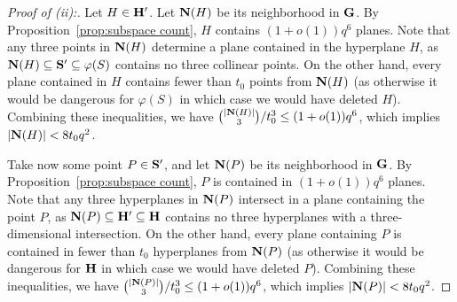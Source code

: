 \documentclass[10pt,a4paper]{amsart}
\begin{document}
    \begin{proof}[Proof of (ii):]Let $H\in \bold{H}'$. Let $\bold{N}(H)$ be its neighborhood in $\bold{G}$. By Proposition~\ref{prop:subspace count}, $H$ contains $(1+o(1))q^6$ planes. Note that any three points in $\bold{N}(H)$ determine a plane contained in the hyperplane $H$, as $\bold{N}(H) \subseteq \bold{S}'\subseteq \varphi(S)$ contains no three collinear points. On the other hand, every plane contained in $H$ contains fewer than $t_0$ points from $\bold{N}(H)$ (as otherwise it would be dangerous for $\varphi(S)$ in which case we would have deleted $H$). Combining these inequalities, we have ${|\bold{N}(H)| \choose 3}/t_0^3\leq (1+o(1))q^6$, which implies  $|\bold{N}(H)|<8t_0q^2$.
    


Take now some point $P \in \bold{S}'$, and let $\bold{N}(P)$ be its neighborhood in $\bold{G}$. By Proposition~\ref{prop:subspace count}, $P$ is contained in $(1+o(1))q^6$ planes. Note that any three hyperplanes in $\bold{N}(P)$ intersect in a plane containing the point $P$, as $\bold{N}(P) \subseteq \bold{H}'\subseteq \bold{H}$ contains no three hyperplanes with a three-dimensional intersection. On the other hand, every plane containing $P$ is contained in fewer than $t_0$ hyperplanes from $\bold{N}(P)$ (as otherwise it would be dangerous for $\bold{H}$ in which case we would have deleted $P$). Combining these inequalities, we have ${|\bold{N}(P)| \choose 3}/t_0^3\leq (1+o(1))q^6$, which implies  $|\bold{N}(P)|<8t_0q^2$.
    \end{proof}
\end{document}
